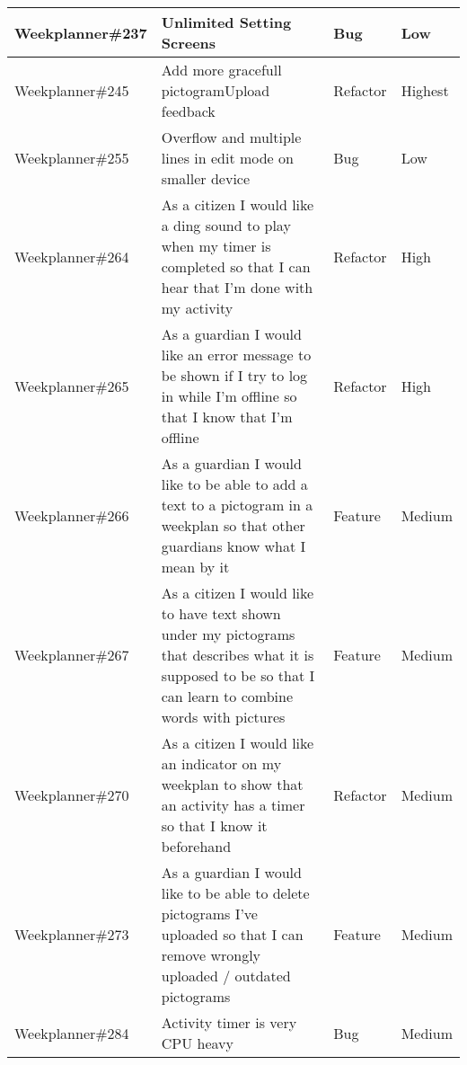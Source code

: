 \begin{longtable}{|p{2.9cm}|p{7cm}|p{1.4cm}|p{1.5cm}|}
    Weekplanner\#237 & Unlimited Setting Screens                                                                                                                                                 & Bug      & Low  \\ \hline
    Weekplanner\#245 & Add more gracefull pictogramUpload feedback                                                                                                                               & Refactor      & Highest  \\ \hline
    Weekplanner\#255 & Overflow and multiple lines in edit mode on smaller device                                                                                                                & Bug      & Low  \\ \hline
    Weekplanner\#264 & As a citizen I would like a ding sound to play when my timer is completed so that I can hear that I'm done with my activity                                               & Refactor      & High  \\ \hline
    Weekplanner\#265 & As a guardian I would like an error message to be shown if I try to log in while I'm offline so that I know that I'm offline                                              & Refactor      & High  \\ \hline
    Weekplanner\#266 & As a guardian I would like to be able to add a text to a pictogram in a weekplan so that other guardians know what I mean by it                                           & Feature      & Medium  \\ \hline
    Weekplanner\#267 & As a citizen I would like to have text shown under my pictograms that describes what it is supposed to be so that I can learn to combine words with pictures              & Feature      & Medium  \\ \hline
    Weekplanner\#270 & As a citizen I would like an indicator on my weekplan to show that an activity has a timer so that I know it beforehand                                                   & Refactor      & Medium  \\ \hline
    Weekplanner\#273 & As a guardian I would like to be able to delete pictograms I've uploaded so that I can remove wrongly uploaded / outdated pictograms                                      & Feature     & Medium  \\ \hline
    Weekplanner\#284 & Activity timer is very CPU heavy                                                                                                                                          & Bug      & Medium  \\ \hline

\end{longtable}
